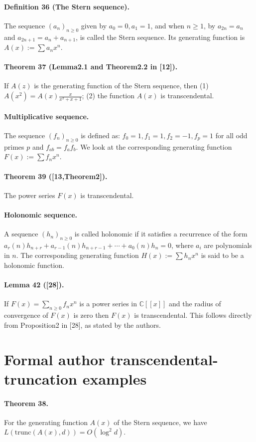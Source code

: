 \documentclass[10pt,a4paper]{article}
\begin{document}
\paragraph{Definition 36 (The Stern sequence).} The sequence $(a_n)_{n\ge0}$ given by $a_0=0,a_1=1$, and when $n\ge1$, by $a_{2n}=a_n$ and $a_{2n+1}=a_n+a_{n+1}$, is called the Stern sequence. Its generating function is $A(x):=\sum a_nx^n$.
\paragraph{Theorem 37 (Lemma2.1 and Theorem2.2 in [12]).} If $A(z)$ is the generating function of the Stern sequence, then (1) $A(x^2)=A(x)\frac{x}{x^2+x+1}$; (2) the function $A(x)$ is transcendental.
\paragraph{Multiplicative sequence.} The sequence $(f_n)_{n\ge0}$ is defined as: $f_0=1,f_1=1,f_2=-1,f_p=1$ for all odd primes $p$ and $f_{ab}=f_af_b$. We look at the corresponding generating function $F(x):=\sum f_nx^n$.
\paragraph{Theorem 39 ([13,Theorem2]).} The power series $F(x)$ is transcendental.
\paragraph{Holonomic sequence.} A sequence $(h_n)_{n\ge0}$ is called holonomic if it satisfies a recurrence of the form $a_r(n)h_{n+r}+a_{r-1}(n)h_{n+r-1}+\cdots+a_0(n)h_n=0$, where $a_i$ are polynomials in $n$. The corresponding generating function $H(x):=\sum h_nx^n$ is said to be a holonomic function.
\paragraph{Lemma 42 ([28]).} If $F(x)=\sum_{n\ge0}f_nx^n$ is a power series in $\mathbb C[[x]]$ and the radius of convergence of $F(x)$ is zero then $F(x)$ is transcendental. This follows directly from Proposition2 in [28], as stated by the authors.

\section*{Formal author transcendental-truncation examples}
\paragraph{Theorem 38.} For the generating function $A(x)$ of the Stern sequence, we have $L(\mathrm{trunc}(A(x),d))=O(\log^2d)$.
\end{document}
